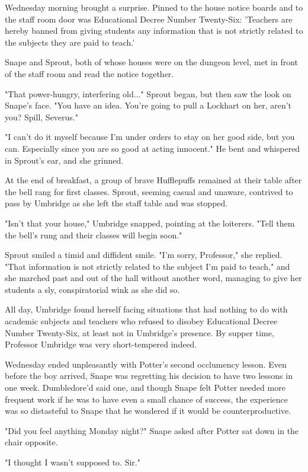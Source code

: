 \documentclass[a4paper,11pt]{article}
\begin{document}
Wednesday morning brought a surprise. Pinned to the house notice boards and to the staff room door was Educational Decree Number Twenty-Six: 'Teachers are hereby banned from giving students any information that is not strictly related to the subjects they are paid to teach.'

Snape and Sprout, both of whose houses were on the dungeon level, met in front of the staff room and read the notice together.

"That power-hungry, interfering old..." Sprout began, but then saw the look on Snape's face. "You have an idea. You're going to pull a Lockhart on her, aren't you? Spill, Severus."

"I can't do it myself because I'm under orders to stay on her good side, but you can. Especially since you are so good at acting innocent." He bent and whispered in Sprout's ear, and she grinned.

At the end of breakfast, a group of brave Hufflepuffs remained at their table after the bell rang for first classes. Sprout, seeming casual and unaware, contrived to pass by Umbridge as she left the staff table and was stopped.

"Isn't that your house," Umbridge snapped, pointing at the loiterers. "Tell them the bell's rung and their classes will begin soon."

Sprout smiled a timid and diffident smile. "I'm sorry, Professor," she replied. "That information is not strictly related to the subject I'm paid to teach," and she marched past and out of the hall without another word, managing to give her students a sly, conspiratorial wink as she did so.

All day, Umbridge found herself facing situations that had nothing to do with academic subjects and teachers who refused to disobey Educational Decree Number Twenty-Six, at least not in Umbridge's presence. By supper time, Professor Umbridge was very short-tempered indeed.

Wednesday ended unpleasantly with Potter's second occlumency lesson. Even before the boy arrived, Snape was regretting his decision to have two lessons in one week. Dumbledore'd said one, and though Snape felt Potter needed more frequent work if he was to have even a small chance of success, the experience was so distasteful to Snape that he wondered if it would be counterproductive.

"Did you feel anything Monday night?" Snape asked after Potter sat down in the chair opposite.

"I thought I wasn't supposed to. Sir."
\end{document}
